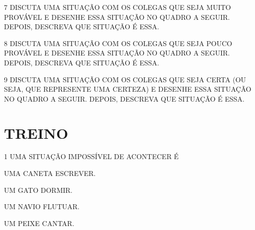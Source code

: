 
\num{7} DISCUTA UMA SITUAÇÃO COM OS COLEGAS QUE SEJA MUITO PROVÁVEL E DESENHE
ESSA SITUAÇÃO NO QUADRO A SEGUIR. DEPOIS, DESCREVA QUE SITUAÇÃO É ESSA.

\begin{mdframed}[linewidth=2pt,linecolor=salmao,roundcorner=10pt]
\vspace{17cm}
\end{mdframed}


\num{8} DISCUTA UMA SITUAÇÃO COM OS COLEGAS QUE SEJA POUCO PROVÁVEL E DESENHE
ESSA SITUAÇÃO NO QUADRO A SEGUIR. DEPOIS, DESCREVA QUE SITUAÇÃO É ESSA.

\begin{mdframed}[linewidth=2pt,linecolor=salmao,roundcorner=10pt]
\vspace{19cm}
\end{mdframed}


\num{9} DISCUTA UMA SITUAÇÃO COM OS COLEGAS QUE SEJA CERTA (OU SEJA, QUE REPRESENTE UMA CERTEZA) E DESENHE ESSA SITUAÇÃO NO QUADRO A SEGUIR. DEPOIS, DESCREVA QUE SITUAÇÃO É ESSA.

\begin{mdframed}[linewidth=2pt,linecolor=salmao,roundcorner=10pt]
\vspace{18cm}
\end{mdframed}

\section*{TREINO}

\num{1} UMA SITUAÇÃO IMPOSSÍVEL DE ACONTECER É

\begin{multicols}{2}
\begin{escolha}
\item UMA CANETA ESCREVER.

\item UM GATO DORMIR.

\item UM NAVIO FLUTUAR.

\item UM PEIXE CANTAR.
\end{escolha}
\end{multicols}

